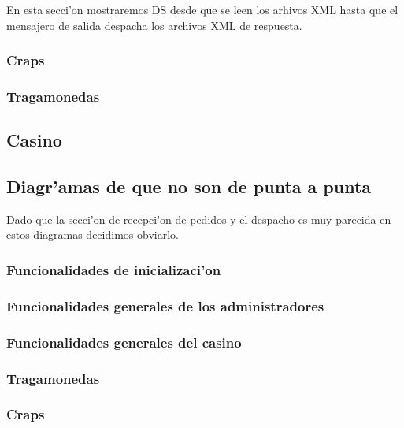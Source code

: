 En esta secci'on mostraremos DS desde que se leen los arhivos XML hasta que el mensajero de salida despacha los archivos XML de respuesta.

\subsubsection{Craps}


\subsubsection{Tragamonedas}


\subsection{Casino}


\subsection{Diagr'amas de que no son de punta a punta}
Dado que la secci'on de recepci'on de pedidos y el despacho es muy parecida en estos diagramas decidimos obviarlo.

\subsubsection{Funcionalidades de inicializaci'on}


\subsubsection{Funcionalidades generales de los administradores}


\subsubsection{Funcionalidades generales del casino}


\subsubsection{Tragamonedas}



\subsubsection{Craps}



